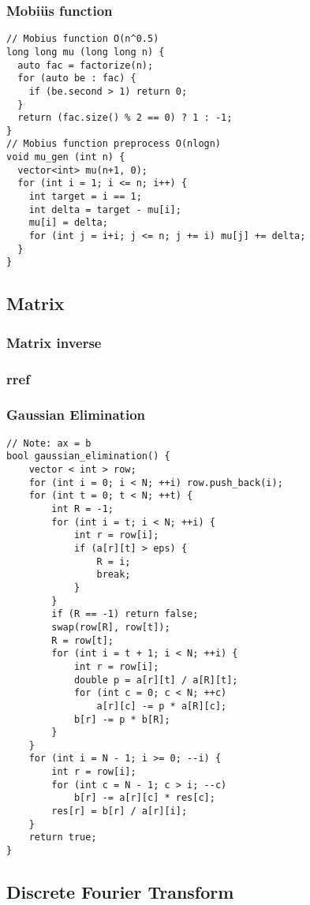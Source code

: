\documentclass[10pt,landscape]{article}
\begin{document}
\begin{multicols}{2}
\subsubsection{Mobi\"us function}
\begin{lstlisting}
// Mobius function O(n^0.5)
long long mu (long long n) {
  auto fac = factorize(n);
  for (auto be : fac) {
    if (be.second > 1) return 0;
  }
  return (fac.size() % 2 == 0) ? 1 : -1;
}
// Mobius function preprocess O(nlogn)
void mu_gen (int n) {
  vector<int> mu(n+1, 0);
  for (int i = 1; i <= n; i++) {
    int target = i == 1;
    int delta = target - mu[i];
    mu[i] = delta;
    for (int j = i+i; j <= n; j += i) mu[j] += delta;
  }
}
\end{lstlisting}
\subsection{Matrix}
\subsubsection{Matrix inverse}
\subsubsection{rref}
\subsubsection{Gaussian Elimination}
\begin{lstlisting}
// Note: ax = b
bool gaussian_elimination() {
    vector < int > row;
    for (int i = 0; i < N; ++i) row.push_back(i);
    for (int t = 0; t < N; ++t) {
        int R = -1;
        for (int i = t; i < N; ++i) {
            int r = row[i];
            if (a[r][t] > eps) {
                R = i;
                break;
            }
        }
        if (R == -1) return false;
        swap(row[R], row[t]);
        R = row[t];
        for (int i = t + 1; i < N; ++i) {
            int r = row[i];
            double p = a[r][t] / a[R][t];
            for (int c = 0; c < N; ++c)
                a[r][c] -= p * a[R][c];
            b[r] -= p * b[R];
        }
    }
    for (int i = N - 1; i >= 0; --i) {
        int r = row[i];
        for (int c = N - 1; c > i; --c)
            b[r] -= a[r][c] * res[c];
        res[r] = b[r] / a[r][i];
    }
    return true;
}
\end{lstlisting}
\subsection{Discrete Fourier Transform}

\end{multicols}
\end{document}
